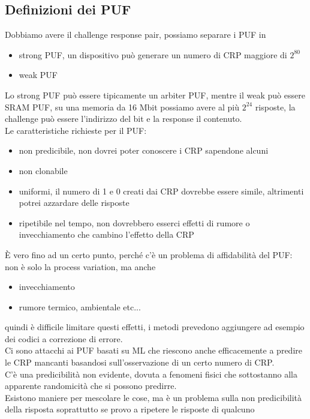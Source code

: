 \documentclass[oneside, 12pt]{extbook}
\begin{document}
\subsection{Definizioni dei PUF}
Dobbiamo avere il challenge response pair, possiamo separare i PUF in
\begin{itemize}
	\item strong PUF, un dispositivo può generare un numero di CRP maggiore di $2^{80}$
	\item weak PUF
\end{itemize}
Lo strong PUF può essere tipicamente un arbiter PUF, mentre il weak può essere SRAM PUF, su una memoria da 16 Mbit possiamo avere al più $2^{24}$ risposte, la challenge può essere l'indirizzo del bit e la response il contenuto.
\\Le caratteristiche richieste per il PUF:
\begin{itemize}
	\item non predicibile, non dovrei poter conoscere i CRP sapendone alcuni
	\item non clonabile
	\item uniformi, il numero di 1 e 0 creati dai CRP dovrebbe essere simile, altrimenti potrei azzardare delle risposte
	\item ripetibile nel tempo, non dovrebbero esserci effetti di rumore o invecchiamento che cambino l'effetto della CRP
\end{itemize}
È vero fino ad un certo punto, perché c'è un problema di affidabilità del PUF: non è solo la process variation, ma anche
\begin{itemize}
	\item invecchiamento
	\item rumore termico, ambientale etc...
\end{itemize}
quindi è difficile limitare questi effetti, i metodi prevedono aggiungere ad esempio dei codici a correzione di errore.\\
Ci sono attacchi ai PUF basati su ML che riescono anche efficacemente a predire le CRP mancanti basandosi sull'osservazione di un certo numero di CRP.
\\C'è una predicibilità non evidente, dovuta a fenomeni fisici che sottostanno alla apparente randomicità che si possono predirre.
\\Esistono maniere per mescolare le cose, ma è un problema sulla non predicibilità della risposta soprattutto se provo a ripetere le risposte di qualcuno
\end{document}
